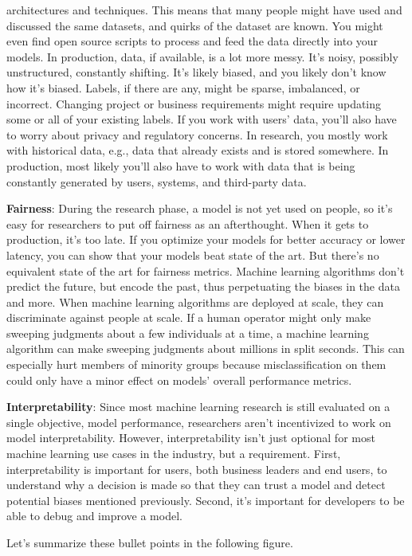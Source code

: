 architectures and techniques. This means that many people might have used and discussed the same datasets, and quirks of
the dataset are known. You might even find open source scripts to process and feed the data directly into your models.
In production, data, if available, is a lot more messy. It's noisy, possibly unstructured, constantly shifting. It's
likely biased, and you likely don't know how it's biased. Labels, if there are any, might be sparse, imbalanced, or
incorrect. Changing project or business requirements might require updating some or all of your existing labels. If
you work with users' data, you'll also have to worry about privacy and regulatory concerns. In research, you mostly work
with historical data, e.g., data that already exists and is stored somewhere. In production, most likely you'll also
have to work with data that is being constantly generated by users, systems, and third-party data.
\item \textbf{Fairness}: During the research phase, a model is not yet used on people, so it's easy for researchers to
put off fairness as an afterthought. When it gets to production, it's too late. If you optimize your models for better
accuracy or lower latency, you can show that your models beat state of the art. But there's no equivalent state of the
art for fairness metrics. Machine learning algorithms don't predict the future, but encode the past, thus perpetuating
the biases in the data and more. When machine learning algorithms are deployed at scale, they can discriminate against
people at scale. If a human operator might only make sweeping judgments about a few individuals at a time, a machine
learning algorithm can make sweeping judgments about millions in split seconds. This can especially hurt members of
minority groups because misclassification on them could only have a minor effect on models' overall performance metrics.
\item \textbf{Interpretability}: Since most machine learning research is still evaluated on a single objective, model
performance, researchers aren't incentivized to work on model interpretability. However, interpretability isn't just
optional for most machine learning use cases in the industry, but a requirement. First, interpretability is important
for users, both business leaders and end users, to understand why a decision is made so that they can trust a model and
detect potential biases mentioned previously. Second, it's important for developers to be able to debug and improve a
model.
\eit

Let's summarize these bullet points in the following figure.

